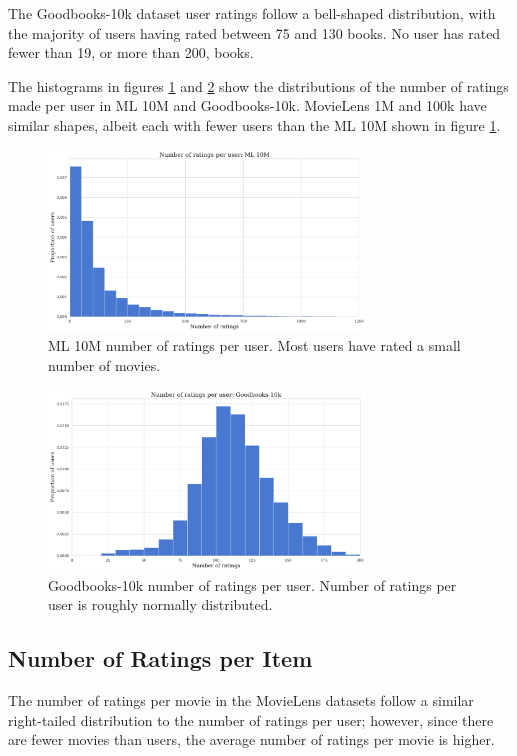 The Goodbooks-10k dataset user ratings follow a bell-shaped distribution, with the majority of users having rated between 75 and 130 books. No user has rated fewer than 19, or more than 200, books.

The histograms in figures \ref{fig:ML10M-users} and \ref{fig:goodbooks-users} show the distributions of the number of ratings made per user in ML 10M and Goodbooks-10k. MovieLens 1M and 100k have similar shapes, albeit each with fewer users than the ML 10M shown in figure \ref{fig:ML10M-users}.

\begin{figure}[H]
\centering
\includegraphics[width=0.75\textwidth]{Figures/3_ratings-distributions/ml_10m_user-ratings.pdf}
\caption{ML 10M number of ratings per user. Most users have rated a small number of movies.}
\label{fig:ML10M-users}
\end{figure}

\begin{figure}[H]
\centering
\includegraphics[width=0.75\textwidth]{Figures/3_ratings-distributions/goodbooks_user-ratings.pdf}
\caption{Goodbooks-10k number of ratings per user. Number of ratings per user is roughly normally distributed.}
\label{fig:goodbooks-users}
\end{figure}

\subsection{Number of Ratings per Item}
The number of ratings per movie in the MovieLens datasets follow a similar right-tailed distribution to the number of ratings per user; however, since there are fewer movies than users, the average number of ratings per movie is higher.

